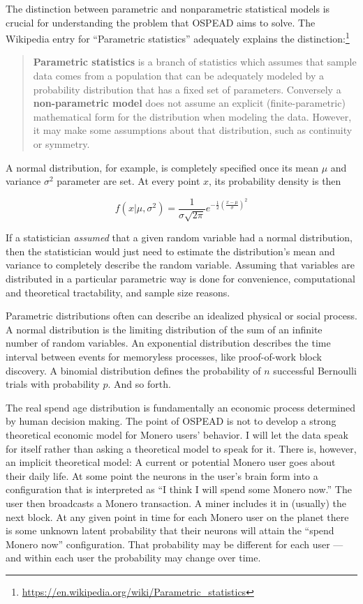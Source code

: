 \documentclass[english]{article}
\begin{document}
The distinction between parametric and nonparametric statistical models
is crucial for understanding the problem that OSPEAD aims to solve.
The Wikipedia entry for ``Parametric statistics'' adequately explains
the distinction:\footnote{\href{https://en.wikipedia.org/wiki/Parametric_statistics}{https://en.wikipedia.org/wiki/Parametric\_statistics}}
\begin{quote}
\textbf{Parametric statistics} is a branch of statistics which assumes
that sample data comes from a population that can be adequately modeled
by a probability distribution that has a fixed set of parameters.
Conversely a \textbf{non-parametric model} does not assume an explicit
(finite-parametric) mathematical form for the distribution when modeling
the data. However, it may make some assumptions about that distribution,
such as continuity or symmetry. 
\end{quote}
A normal distribution, for example, is completely specified once its
mean $\mu$ and variance $\sigma^{2}$ parameter are set. At every
point $x$, its probability density is then

\[
f\left(x|\mu,\sigma^{2}\right)=\dfrac{1}{\sigma\sqrt{2\pi}}e^{-\tfrac{1}{2}\left(\tfrac{x-\mu}{\sigma}\right)^{2}}
\]

If a statistician \textit{assumed} that a given random variable had
a normal distribution, then the statistician would just need to estimate
the distribution's mean and variance to completely describe the random
variable. Assuming that variables are distributed in a particular
parametric way is done for convenience, computational and theoretical
tractability, and sample size reasons.

Parametric distributions often can describe an idealized physical
or social process. A normal distribution is the limiting distribution
of the sum of an infinite number of random variables. An exponential
distribution describes the time interval between events for memoryless
processes, like proof-of-work block discovery. A binomial distribution
defines the probability of $n$ successful Bernoulli trials with probability
$p$. And so forth.

The real spend age distribution is fundamentally an economic process
determined by human decision making. The point of OSPEAD is not to
develop a strong theoretical economic model for Monero users' behavior.
I will let the data speak for itself rather than asking a theoretical
model to speak for it. There is, however, an implicit theoretical
model: A current or potential Monero user goes about their daily life.
At some point the neurons in the user's brain form into a configuration
that is interpreted as ``I think I will spend some Monero now.''
The user then broadcasts a Monero transaction. A miner includes it
in (usually) the next block. At any given point in time for each Monero
user on the planet there is some unknown latent probability that their
neurons will attain the ``spend Monero now'' configuration. That
probability may be different for each user --- and within each user
the probability may change over time.
\end{document}
